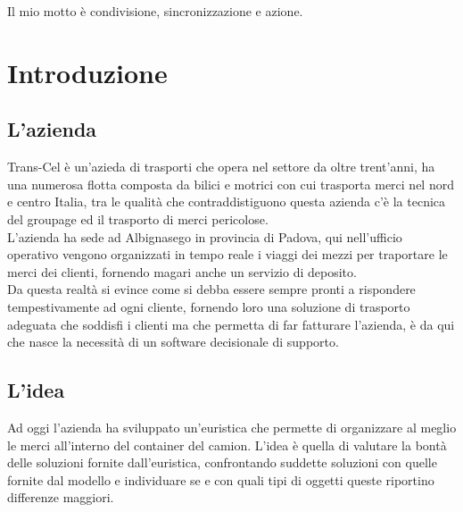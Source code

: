 \begin{savequote}[75mm]
    Il mio motto è condivisione, sincronizzazione e azione.
\end{savequote}

\chapter*{Introduzione}
\label{introduzione}
\section{L'azienda}
Trans-Cel è un'azieda di trasporti che opera nel settore da oltre trent'anni, ha una numerosa flotta composta da bilici e motrici con cui trasporta merci nel nord e centro Italia, tra le qualità che contraddistiguono questa azienda c'è la tecnica del groupage ed il trasporto di merci pericolose.\\
L'azienda ha sede ad Albignasego in provincia di Padova, qui nell'ufficio operativo vengono organizzati in tempo reale i viaggi dei mezzi per traportare le merci dei clienti, fornendo magari anche un servizio di deposito.\\
Da questa realtà si evince come si debba essere sempre pronti a rispondere tempestivamente ad ogni cliente, fornendo loro una soluzione di trasporto adeguata che soddisfi i clienti ma che permetta di far fatturare l'azienda, è da qui che nasce la necessità di un software decisionale di supporto.

\section{L'idea}
Ad oggi l'azienda ha sviluppato un'euristica che permette di organizzare al meglio le merci all'interno del container del camion.
L'idea è quella di valutare la bontà delle soluzioni fornite dall'euristica, confrontando suddette soluzioni con quelle fornite dal modello e individuare se e con quali tipi di oggetti queste riportino differenze maggiori.

